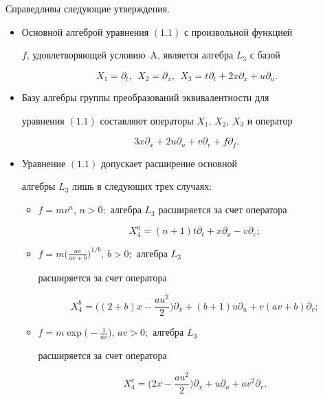 \begin{thm} 


Справедливы следующие утверждения. 


\begin{itemize} 


\item[1)] Основной алгеброй уравнения $(1.1)$ с произвольной функцией 


$f$, удовлетворяющей условию~$\mathrm A$, является алгебра $L_3$ с базой 


$$ 


X_1=\partial_t,\ \ X_2=\partial_x,\ \ X_3=t\partial_t+ 


2x\partial_x+u\partial_u. 


$$ 


\item[2)] Базу алгебры группы преобразований эквивалентности для 


уравнения $(1.1)$ составляют операторы $X_1$, $X_2$, $X_3$ и оператор 


$$ 


3x\partial_x+2u\partial_u+v\partial_v+f\partial_f. 


$$ 


\item[3)] Уравнение $(1.1)$ допускает расширение основной 


алгебры $L_3$ лишь в следующих трех случаях\/${:}$ 


\begin{itemize} 


\item[a)] $f=mv^n$, $n>0;$ алгебра $L_3$ расширяется за счет оператора 


$$ 


X^a_4=(n+1)t\partial_t+x\partial_x-v\partial_v; 


$$ 


\item[b)] $f=m\big(\frac{av}{av+b}\big)^{1/b}$, $b>0;$ алгебра $L_3$ 


расширяется за счет оператора 


$$ 


X^b_4=\bigg((2+b)x-\frac{au^2}{2}\bigg)\partial_x+ 


(b+1)u\partial_u+v(av+b)\partial_v; 


$$ 


\item[c)] $f=m\exp\big(-\frac{1}{av}\big)$, $av>0;$ алгебра $L_3$ 


расширяется за счет оператора 


$$ 


X^c_4=\bigg(2x-\frac{au^2}{2}\bigg)\partial_x+u\partial_u+ 


av^2\partial_v. 


$$ 


\end{itemize} 


\end{itemize} 


\end{thm} 


